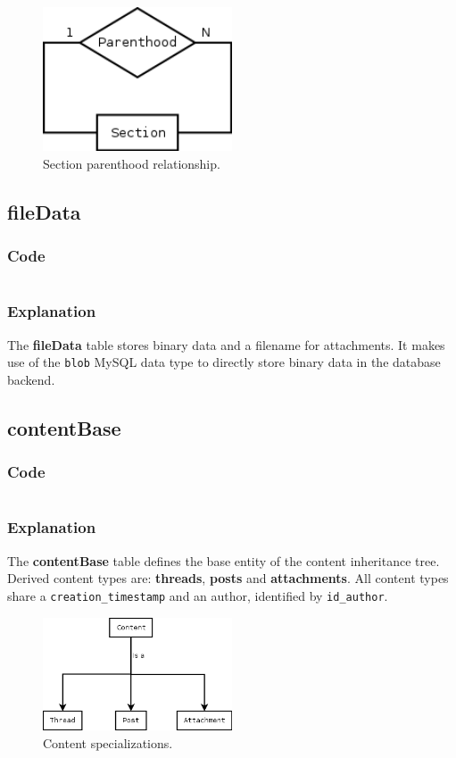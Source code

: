 \documentclass[12pt]{report}
\renewcommand\emph{\textbf}
\newcommand{\printSQLtest}[1]
{
    \inputminted[linenos, breaklines, breakbytoken, tabsize=4, fontsize=\footnotesize]{mysql}{#1}
}
\newcommand{\printSQLTablepage}[2]
{    
    \subsection{#2}
    \subsubsection{Code}
    \printSQLtest{../sql/parts/#1}
    \subsubsection{Explanation}
}
\begin{document}
                    \begin{figure}[!htb]
                    \caption{Section parenthood relationship.}
                    \centering
                    \includegraphics[width=0.5\textwidth]{td/05section}
                    \end{figure}

                \newpage

                \printSQLTablepage{06_tblFileData.sql}{fileData}
                    The \emph{fileData} table stores binary data and a filename for attachments. It makes use of the \texttt{blob} MySQL data type to directly store binary data in the database backend.

                \newpage

                \printSQLTablepage{07_tblContentBase.sql}{contentBase}
                    The \emph{contentBase} table defines the base entity of the content inheritance tree. Derived content types are: \emph{threads}, \emph{posts} and \emph{attachments}.
                    All content types share a \texttt{creation_timestamp} and an author, identified by \texttt{id_author}.

                    \begin{figure}[!htb]
                    \caption{Content specializations.}
                    \centering
                    \includegraphics[width=0.5\textwidth]{td/07contentbase}
                    \end{figure}

                \newpage
\end{document}
